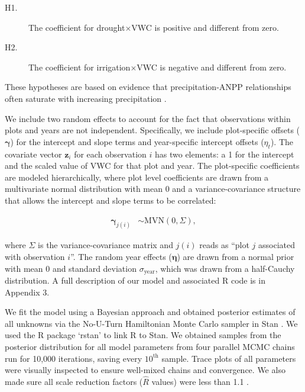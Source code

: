\documentclass[fleqn,10pt,lineno]{wlpeerj} %
\begin{document}
\begin{description}
\item [H1.] The coefficient for drought$\times$VWC is positive and different from zero.
\item [H2.] The coefficient for irrigation$\times$VWC is negative and different from zero.
\end{description}

\noindent{}These hypotheses are based on evidence that
precipitation-ANPP relationships often saturate with increasing
precipitation \citep{Hsu2012, Gherardi2015a}.

We include two random effects to account for the fact that observations
within plots and years are not independent. Specifically, we include
plot-specific offsets (\(\boldsymbol{\gamma}\)) for the intercept and
slope terms and year-specific intercept offsets (\(\eta_t\)). The
covariate vector \(\textbf{z}_i\) for each observation \(i\) has two
elements: a 1 for the intercept and the scaled value of VWC for that
plot and year. The plot-specific coefficients are modeled
hierarchically, where plot level coefficients are drawn from a
multivariate normal distribution with mean 0 and a variance-covariance
structure that allows the intercept and slope terms to be correlated:

\vspace{-1em}

\begin{align}
\boldsymbol{\gamma}_{j(i)} &\sim \text{MVN} \left( 0, \Sigma  \right),
\end{align}

\noindent{}where \(\Sigma\) is the variance-covariance matrix and
\(j(i)\) reads as ``plot \(j\) associated with observation \(i\)''. The
random year effects (\(\boldsymbol{\eta}\)) are drawn from a normal
prior with mean 0 and standard deviation \(\sigma_{\text{year}}\), which
was drawn from a half-Cauchy distribution.
A full description of our model and associated R \citep{R2016} code is
in Appendix 3.

We fit the model using a Bayesian approach and obtained posterior
estimates of all unknowns via the No-U-Turn Hamiltonian Monte Carlo
sampler in Stan \citep{stan2016}. We used the R package `rstan'
\citep{rstan2016} to link R \citep{R2016} to Stan. We obtained samples
from the posterior distribution for all model parameters from four
parallel MCMC chains run for 10,000 iterations, saving every
\(10^{\text{th}}\) sample. Trace plots of all parameters were visually
inspected to ensure well-mixed chains and convergence. We also made sure
all scale reduction factors (\(\hat{R}\) values) were less than 1.1
\citep{Gelman2009}.
\end{document}
